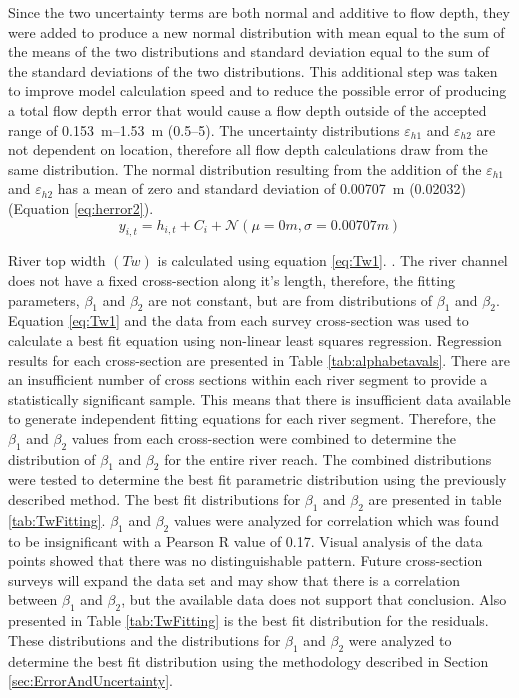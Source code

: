 \begin{linenumbers}
Since the two uncertainty terms are both normal and additive to flow depth, they were added to produce a new normal distribution with mean equal to the sum of the means of the two distributions and standard deviation equal to the sum of the standard deviations of the two distributions.  This additional step was taken to improve model calculation speed and to reduce the possible error of producing a total flow depth error that would cause a flow depth outside of the accepted range of \SIrange{0.153}{1.53}{\meter} (\SIrange{0.5}{5}{\foot}).  The uncertainty distributions $ \varepsilon_{h1} $ and $ \varepsilon_{h2} $ are not dependent on location, therefore all flow depth calculations draw from the same distribution.  The normal distribution resulting from the addition of the $ \varepsilon_{h1} $ and $ \varepsilon_{h2} $ has a mean of zero and standard deviation of \SI{0.00707}{\meter} (\SI{0.02032}{\foot}) (Equation \ref{eq:herror2}).  
\begin{equation}
	y_{i,t}=h_{i,t}+C_{i}+\mathcal{N} \left( \mu=0m, \sigma=0.00707m \right)
	\label{eq:herror2}
\end{equation}

River top width $ \left( Tw \right)  $ is calculated using equation \ref{eq:Tw1}.    \parencite{Buhman2002,Gates1996}. The river channel does not have a fixed cross-section along it's length, therefore, the fitting parameters, $ \beta_1 $ and $ \beta_2 $ are not constant, but are from distributions of  $ \beta_1 $ and $ \beta_2 $.  Equation \ref{eq:Tw1} and the data from each survey cross-section was used to calculate a best fit equation using non-linear least squares regression.  Regression results for each cross-section are presented in Table \ref{tab:alphabetavals}.  There are an insufficient number of cross sections within each river segment to provide a statistically significant sample.  This means that there is insufficient data available to generate independent fitting equations for each river segment.  Therefore, the $ \beta_1 $ and $ \beta_2 $ values from each cross-section were combined to determine the distribution of $ \beta_1 $ and $ \beta_2 $ for the entire river reach.  The combined distributions were tested to determine the best fit parametric distribution using the previously described method.  The best fit distributions for $ \beta_1 $ and $ \beta_2 $ are presented in table \ref{tab:TwFitting}.  $ \beta_1 $ and $ \beta_2 $ values were analyzed for correlation which was found to be insignificant with a Pearson R value of 0.17.  Visual analysis of the data points showed that there was no distinguishable pattern.  Future cross-section surveys will expand the data set and may show that there is a correlation between $ \beta_1 $ and $ \beta_2 $, but the available data does not support that conclusion.  Also presented in Table \ref{tab:TwFitting} is the best fit distribution for the residuals.  These distributions and the distributions for $ \beta_1 $ and $ \beta_2 $ were analyzed to determine the best fit distribution using the methodology described in Section \ref{sec:ErrorAndUncertainty}.


\end{linenumbers}
